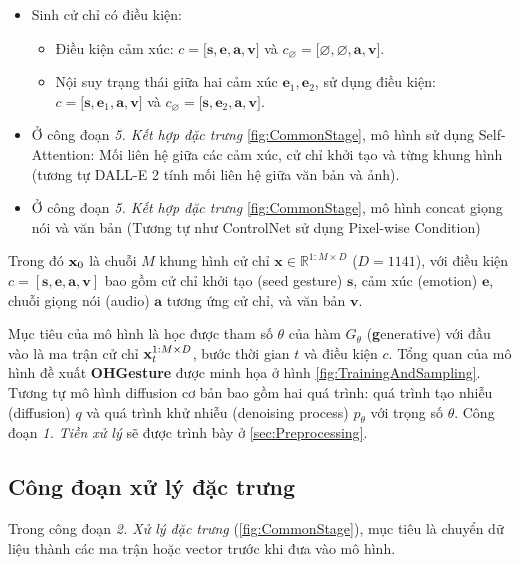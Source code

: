 \begin{itemize}
	\item Sinh cử chỉ có điều kiện:
	\begin{itemize}
		\item Điều kiện cảm xúc: $c = \big[ \mathbf{s}, \mathbf{e}, \mathbf{a}, \mathbf{v} \big]$ và $c_{\varnothing} = \big[ \varnothing, \varnothing, \mathbf{a}, \mathbf{v}\big]$.
		\item Nội suy trạng thái giữa hai cảm xúc $\mathbf{e}_1, \mathbf{e}_2$, sử dụng điều kiện: $c = \big[ \mathbf{s}, \mathbf{e}_1, \mathbf{a}, \mathbf{v} \big]$ và $c_{\varnothing} = \big[ \mathbf{s}, \mathbf{e}_2, \mathbf{a}, \mathbf{v} \big]$.
	\end{itemize}
	\item Ở công đoạn \textit{5. Kết hợp đặc trưng} \autoref{fig:CommonStage}, mô hình sử dụng Self-Attention: Mối liên hệ giữa các cảm xúc, cử chỉ khởi tạo và từng khung hình (tương tự DALL-E 2 tính mối liên hệ giữa văn bản và ảnh).
	\item Ở công đoạn \textit{5. Kết hợp đặc trưng} \autoref{fig:CommonStage}, mô hình concat giọng nói và văn bản (Tương tự như ControlNet sử dụng Pixel-wise Condition)
\end{itemize}

Trong đó $\mathbf{x}_0$ là chuỗi $M$ khung hình cử chỉ $\mathbf{x} \in \mathbb{R}^{1:M \times D}$ ($D = 1141$), với điều kiện $c = [\mathbf{s}, \mathbf{e}, \mathbf{a}, \mathbf{v}]$ bao gồm cử chỉ khởi tạo (seed gesture) $\mathbf{s}$,  cảm xúc (emotion) $\mathbf{e}$, chuỗi giọng nói (audio) $\mathbf{a}$ tương ứng cử chỉ, và văn bản  $\mathbf{v}$.

Mục tiêu của mô hình là học được tham số $\theta$ của hàm $G_{\theta}$ (\textbf{g}enerative) với đầu vào là ma trận cử chỉ $\mathbf{x}^{1:M \times D}_t$, bước thời gian $t$ và điều kiện $c$.
Tổng quan của mô hình đề xuất \textbf{OHGesture} được minh họa ở hình \autoref{fig:TrainingAndSampling}. Tương tự mô hình diffusion cơ bản bao gồm hai quá trình: quá trình tạo nhiễu (diffusion) $q$ và quá trình khử nhiễu (denoising process) $p_{\theta}$ với trọng số $\theta$. Công đoạn \textit{1. Tiền xử lý} sẽ được trình bày ở \autoref{sec:Preprocessing}.

\subsection{Công đoạn xử lý đặc trưng}
Trong công đoạn \textit{2. Xử lý đặc trưng} (\autoref{fig:CommonStage}), mục tiêu là chuyển dữ liệu  thành các ma trận hoặc vector trước khi đưa vào mô hình.

